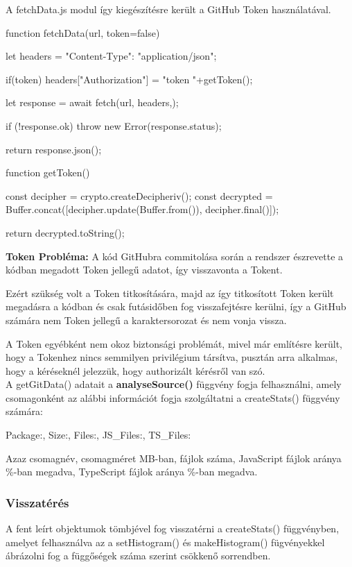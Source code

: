 A fetchData.js modul így kiegészítésre került a GitHub Token használatával.

\pagebreak

\begin{js}
function fetchData(url, token=false){
	let headers = {"Content-Type": "application/json"};
	
	if(token){
		headers["Authorization"] = "token "+getToken();
	}
	
	let response = await fetch(url, {headers,});
	
	if (!response.ok) {
		throw new Error(response.status);
	}
	
	return response.json();
}

function getToken(){
	const decipher = crypto.createDecipheriv();
	const decrypted = Buffer.concat([decipher.update(Buffer.from()),
						decipher.final()]);
	
	return decrypted.toString();
}
\end{js}
\textbf{Token Probléma:} A kód GitHubra commitolása során a rendszer észrevette a kódban megadott Token jellegű adatot, így visszavonta a Tokent. 

Ezért szükség volt a Token titkosítására, majd az így titkosított Token került megadásra a kódban és csak futásidőben fog visszafejtésre kerülni, így a GitHub számára nem Token jellegű a karaktersorozat és nem vonja vissza.

A Token egyébként nem okoz biztonsági problémát, mivel már említésre került, hogy a Tokenhez nincs semmilyen privilégium társítva, pusztán arra alkalmas, hogy a kéréseknél jelezzük, hogy authorizált kérésről van szó.\\

A getGitData() adatait a \textbf{analyseSource()} függvény fogja felhasználni, amely csomagonként az alábbi információt fogja szolgáltatni a createStats() függvény számára:

\begin{js}
{Package:, Size:, Files:, JS_Files:, TS_Files:}
\end{js}
Azaz csomagnév, csomagméret MB-ban, fájlok száma, JavaScript fájlok aránya \%-ban megadva, TypeScript fájlok aránya \%-ban megadva.

\subsubsection{Visszatérés}

A fent leírt objektumok tömbjével fog visszatérni a createStats() függvényben, amelyet felhasználva az a setHistogram() és makeHistogram() fügvényekkel ábrázolni fog a függőségek száma szerint csökkenő sorrendben.

